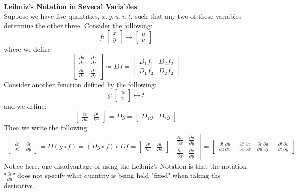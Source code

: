 \documentclass[11pt,oneside]{book}
\theoremstyle{break}
\theoremstyle{break}
\begin{document}
\newpage
\textbf{Leibniz's Notation in Several Variables}\\
Suppose we have five quantities, $x,y,u,v,t$, such that any two of these variables determine the other three. Consider the following:
$$f:\begin{bmatrix}
x\\y \end{bmatrix} \mapsto \begin{bmatrix}
u\\v \end{bmatrix}
$$
where we define
$$\begin{bmatrix}
\frac{\partial u}{\partial x} &\frac{\partial u}{\partial y} \\
\frac{\partial v}{\partial x} &\frac{\partial v}{\partial y}
\end{bmatrix} \coloneqq 
Df = \begin{bmatrix}
D_1f_1 & D_2f_2 \\ D_1f_2 & D_2f_2
\end{bmatrix} 
$$
Consider another function defined by the following:
$$g:
\begin{bmatrix}
u\\v
\end{bmatrix}\mapsto t$$
and we define:
$$
\begin{bmatrix}
\frac{\partial t}{\partial u}& \frac{\partial t}{\partial v}
\end{bmatrix} \coloneqq
Dg = \begin{bmatrix}D_1g& D_2g
\end{bmatrix}
$$
Then we write the following:
\begin{align*}
\begin{bmatrix}
\frac{\partial t}{\partial x} & \frac{\partial t}{\partial y}
\end{bmatrix} = D(g\circ f) = (Dg\circ f)\circ Df 
= \begin{bmatrix}
\frac{\partial t}{\partial u}& \frac{\partial t}{\partial v}
\end{bmatrix} \begin{bmatrix}
\frac{\partial u}{\partial x}&\frac{\partial u}{\partial y}\\
\frac{\partial v}{\partial x}&\frac{\partial v}{\partial y}
\end{bmatrix}
=
\begin{bmatrix}
\frac{\partial t}{\partial u}\frac{\partial u}{\partial x}+\frac{\partial t}{\partial v}\frac{\partial v}{\partial x}& \frac{\partial t}{\partial u}\frac{\partial u}{\partial y} + \frac{\partial t}{\partial v}\frac{\partial v}{\partial y}
\end{bmatrix}
\end{align*}
Notice here, one disadvantage of using the Leibniz's Notation is that the notation "$\frac{\partial t}{\partial u}$" does not specify what quantity is being held "fixed" when taking the derivative. \\
\end{document}
